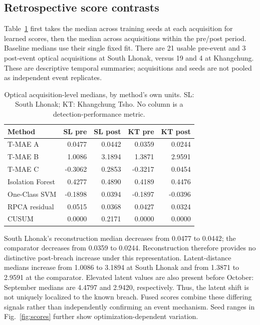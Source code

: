 \subsection{Retrospective score contrasts}
Table~\ref{tab:contrasts} first takes the median across training seeds at each acquisition for learned scores, then the median across acquisitions within the pre/post period. Baseline medians use their single fixed fit. There are 21 usable pre-event and 3 post-event optical acquisitions at South Lhonak, versus 19 and 4 at Khangchung. These are descriptive temporal summaries; acquisitions and seeds are not pooled as independent event replicates.

\begin{table}[t]\centering\scriptsize
\caption{Optical acquisition-level medians, by method's own units. SL: South Lhonak; KT: Khangchung Tsho. No column is a detection-performance metric.}\label{tab:contrasts}
\begin{tabular}{lrrrr}\toprule
Method & SL pre & SL post & KT pre & KT post\\\midrule
T-MAE A & 0.0477 & 0.0442 & 0.0359 & 0.0244\\
T-MAE B & 1.0086 & 3.1894 & 1.3871 & 2.9591\\
T-MAE C & -0.3062 & 0.2853 & -0.3217 & 0.0454\\
Isolation Forest & 0.4277 & 0.4890 & 0.4189 & 0.4476\\
One-Class SVM & -0.1898 & 0.0394 & -0.1897 & -0.0396\\
RPCA residual & 0.0515 & 0.0368 & 0.0427 & 0.0324\\
CUSUM & 0.0000 & 0.2171 & 0.0000 & 0.0000\\
\bottomrule\end{tabular}
\end{table}

South Lhonak's reconstruction median decreases from 0.0477 to 0.0442; the comparator decreases from 0.0359 to 0.0244. Reconstruction therefore provides no distinctive post-breach increase under this representation. Latent-distance medians increase from 1.0086 to 3.1894 at South Lhonak and from 1.3871 to 2.9591 at the comparator. Elevated latent values are also present before October: September medians are 4.4797 and 2.9420, respectively. Thus, the latent shift is not uniquely localized to the known breach. Fused scores combine these differing signals rather than independently confirming an event mechanism. Seed ranges in Fig.~\ref{fig:scores} further show optimization-dependent variation.

